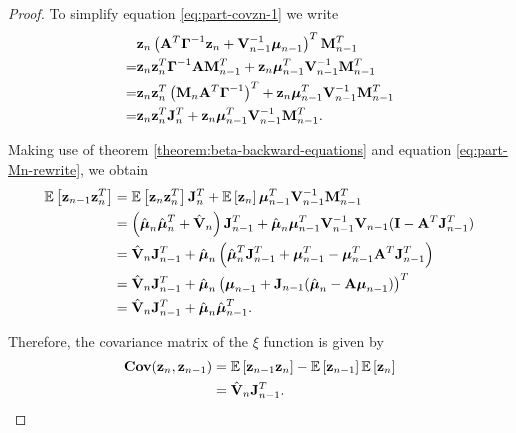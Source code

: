 \documentclass[11pt]{article}
\numberwithin{equation}{section}
\newcommand{\expectation}[1]{\mathbb{E}\left[#1\right]}
\newcommand{\z}{{\bf z}}
\begin{document}
\begin{proof}
	To simplify equation \eqref{eq:part-covzn-1} we write
	\begin{align}
		&\z_n \left({\bf A}^T\boldsymbol\Gamma^{-1}\z_{n} + {\bf V}_{n-1}^{-1}\boldsymbol\mu_{n-1}\right)^T {\bf M}_{n-1}^T \\
		=& \z_n \z_n^T \boldsymbol{\Gamma}^{-1}{\bf A} {\bf M}_{n-1}^T + \z_n \boldsymbol{\mu}_{n-1}^T {\bf V}_{n-1}^{-1}{\bf M}_{n-1}^T\\
		=& \z_n \z_n^T \left({\bf M}_n {\bf A}^T \boldsymbol\Gamma^{-1}\right)^T + \z_n \boldsymbol{\mu}_{n-1}^T {\bf V}_{n-1}^{-1}{\bf M}_{n-1}^T\\
		=& \z_n\z_n^T {\bf J}_n^T + \z_n \boldsymbol{\mu}_{n-1}^T {\bf V}_{n-1}^{-1}{\bf M}_{n-1}^T.
	\end{align}
	
	Making use of theorem \ref{theorem:beta-backward-equations} and equation \ref{eq:part-Mn-rewrite}, we obtain
	\begin{align}
		\expectation{\z_{n-1}\z_n^T} &= \expectation{\z_n\z_n^T} {\bf J}_n^T + \expectation{\z_n}\boldsymbol{\mu}_{n-1}^T {\bf V}_{n-1}^{-1}{\bf M}_{n-1}^T\\
		&= \left(\hat{\boldsymbol{\mu}}_n\hat{\boldsymbol{\mu}}_n^T + \hat{\bf V}_n \right){\bf J}_{n-1}^T + \hat{\boldsymbol{\mu}}_n \boldsymbol{\mu}_{n-1}^T {\bf V}_{n-1}^{-1} {\bf V}_{n-1}({\bf I} - {\bf A}^T{\bf J}_{n-1}^T)\\
		&= \hat{\bf V}_n {\bf J}_{n-1}^T + \hat{\boldsymbol{\mu}}_n\left(\hat{\boldsymbol{\mu}}_n^T{\bf J}_{n-1}^T + \boldsymbol{\mu}_{n-1}^T - \boldsymbol{\mu}_{n-1}^T{\bf A}^T{\bf J}_{n-1}^T \right)\\
		&= \hat{\bf V}_n {\bf J}_{n-1}^T + \hat{\boldsymbol{\mu}}_n\left( \boldsymbol{\mu}_{n-1} + {\bf J}_{n-1} (\hat{\boldsymbol{\mu}}_n - {\bf A}\boldsymbol{\mu}_{n-1})\right)^T\\
		&= \hat{\bf V}_n {\bf J}_{n-1}^T + \hat{\boldsymbol{\mu}}_n \hat{\boldsymbol{\mu}}_{n-1}^T.
	\end{align}
	
	Therefore, the covariance matrix of the $\xi$ function is given by
	\begin{align}
		{\bf Cov}(\z_n, \z_{n-1}) &= \expectation{\z_{n-1}\z_{n}} - \expectation{\z_{n-1}}\expectation{\z_{n}}\\
		&= \hat{\bf V}_n {\bf J}_{n-1}^T.
	\end{align}
\end{proof}
\end{document}
